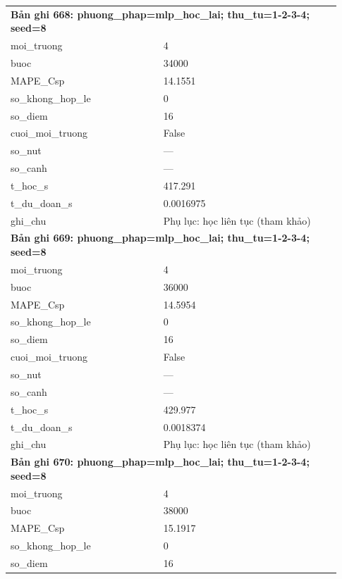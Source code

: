 \begin{longtable}{p{0.43\linewidth}p{0.50\linewidth}}
\midrule
\multicolumn{2}{p{0.95\linewidth}}{\textbf{Bản ghi 668: phuong\_phap=mlp\_hoc\_lai; thu\_tu=1-2-3-4; seed=8}} \\
moi\_\allowbreak truong & 4 \\
buoc & 34000 \\
MAPE\_\allowbreak Csp & 14.1551 \\
so\_\allowbreak khong\_\allowbreak hop\_\allowbreak le & 0 \\
so\_\allowbreak diem & 16 \\
cuoi\_\allowbreak moi\_\allowbreak truong & False \\
so\_\allowbreak nut & — \\
so\_\allowbreak canh & — \\
t\_\allowbreak hoc\_\allowbreak s & 417.291 \\
t\_\allowbreak du\_\allowbreak doan\_\allowbreak s & 0.0016975 \\
ghi\_\allowbreak chu & Phụ lục: học liên tục (tham khảo) \\
\midrule
\multicolumn{2}{p{0.95\linewidth}}{\textbf{Bản ghi 669: phuong\_phap=mlp\_hoc\_lai; thu\_tu=1-2-3-4; seed=8}} \\
moi\_\allowbreak truong & 4 \\
buoc & 36000 \\
MAPE\_\allowbreak Csp & 14.5954 \\
so\_\allowbreak khong\_\allowbreak hop\_\allowbreak le & 0 \\
so\_\allowbreak diem & 16 \\
cuoi\_\allowbreak moi\_\allowbreak truong & False \\
so\_\allowbreak nut & — \\
so\_\allowbreak canh & — \\
t\_\allowbreak hoc\_\allowbreak s & 429.977 \\
t\_\allowbreak du\_\allowbreak doan\_\allowbreak s & 0.0018374 \\
ghi\_\allowbreak chu & Phụ lục: học liên tục (tham khảo) \\
\midrule
\multicolumn{2}{p{0.95\linewidth}}{\textbf{Bản ghi 670: phuong\_phap=mlp\_hoc\_lai; thu\_tu=1-2-3-4; seed=8}} \\
moi\_\allowbreak truong & 4 \\
buoc & 38000 \\
MAPE\_\allowbreak Csp & 15.1917 \\
so\_\allowbreak khong\_\allowbreak hop\_\allowbreak le & 0 \\
so\_\allowbreak diem & 16 \\

\end{longtable}

